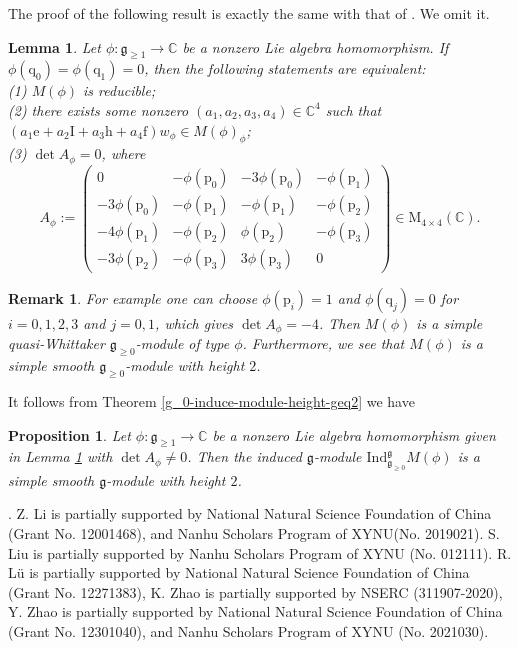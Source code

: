 \documentclass[12pt, a4paper]{amsart}
\newcommand{\fg}{\mathfrak g}
\newcommand{\C}{\mathbb{C}}
\newcommand{\rh}{\mathrm{h}}
\newcommand{\re}{\mathrm{e}}
\newcommand{\rf}{\mathrm{f}}
\newcommand{\ri}{\mathrm{I}}
\theoremstyle{Theorem}
\theoremstyle{Theorem}
\newtheorem{lemma}[thm]{Lemma}
\newtheorem{proposition}[thm]{Proposition}
\newtheorem{remark}[thm]{Remark}
\numberwithin{equation}{section}
\begin{document}
The proof of the following result is exactly the same with that of \cite[Lemma 3.1]{CC}. 
We omit it.
\begin{lemma}\label{6.2}
	Let $\phi:\fg_{\geq1}\rightarrow\C$ be a nonzero Lie algebra homomorphism. 
	If $\phi(\mathrm{q}_{0})=\phi(\mathrm{q}_{1})=0$, then the following statements are equivalent:\\  
	(1) $M(\phi)$ is reducible;\\ 
	(2) there exists some nonzero $(a_{1},a_{2},a_{3},a_{4})\in\C^{4}$ such that $(a_{1}\re+a_{2}\ri+a_{3}\rh+a_{4}\rf)w_{\phi}\in M(\phi)_{\phi}$;\\
	(3) $\det A_{\phi}=0$, where
	\[A_{\phi}:=\left(\begin{array}{cccc}
		0 & -\phi(\mathrm{p}_{0}) & -3\phi(\mathrm{p}_{0}) & -\phi(\mathrm{p}_{1})\\
		-3\phi(\mathrm{p}_{0}) & -\phi(\mathrm{p}_{1}) & -\phi(\mathrm{p}_{1}) & -\phi(\mathrm{p}_{2})\\
		-4\phi(\mathrm{p}_{1}) & -\phi(\mathrm{p}_{2}) & \phi(\mathrm{p}_{2}) & -\phi(\mathrm{p}_{3})\\
		-3\phi(\mathrm{p}_{2}) & -\phi(\mathrm{p}_{3}) & 3\phi(\mathrm{p}_{3}) & 0
	\end{array}\right)\in\text{M}_{4\times4}(\C).
	\]
\end{lemma}
\begin{remark}
	For example one can choose $\phi(\mathrm{p}_{i})=1$ and $\phi(\mathrm{q}_{j})=0$ for $i=0,1,2,3$ and $j=0,1$, 
	which gives $\det A_{\phi}=-4$. Then $M(\phi)$ is a simple quasi-Whittaker $\fg_{\geq0}$-module of type $\phi$. 
	Furthermore, we see that $M(\phi)$ is a simple smooth $\fg_{\geq0}$-module with height $2$.
\end{remark}

It follows from Theorem \ref{g_0-induce-module-height-geq2} we have
\begin{proposition}
	Let $\phi:\fg_{\geq1}\rightarrow\C$ be a nonzero Lie algebra homomorphism given in Lemma  \ref{6.2} with $\det A_{\phi}\ne0$. 
	Then the induced $\fg$-module $\mathrm{Ind}_{\fg_{\geq0}}^{\fg}M(\phi)$ is
	a simple smooth $\fg$-module with height $2$.
\end{proposition}





. Z. Li is partially supported by National Natural Science
Foundation of China (Grant No. 12001468), and Nanhu Scholars Program of XYNU(No. 2019021). S. Liu is partially supported by Nanhu Scholars Program of XYNU (No. 012111). R. L\"u is partially supported by National Natural Science Foundation of China (Grant No.
12271383), K. Zhao is  partially supported
by   NSERC
(311907-2020), Y. Zhao is partially supported by National Natural Science Foundation of China (Grant No.
12301040), and Nanhu Scholars Program of XYNU (No. 2021030). 
\end{document}
